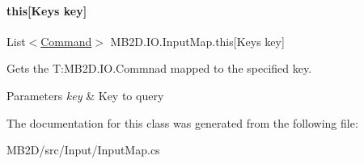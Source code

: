 \paragraph{\texorpdfstring{this[Keys key]}{this[Keys key]}}
{\footnotesize\ttfamily List$<$\hyperlink{class_m_b2_d_1_1_i_o_1_1_command}{Command}$>$ M\+B2\+D.\+I\+O.\+Input\+Map.\+this\mbox{[}Keys key\mbox{]}\hspace{0.3cm}{\ttfamily [get]}}



Gets the T\+:\+M\+B2\+D.\+I\+O.\+Commnad mapped to the specified key. 


\begin{DoxyParams}{Parameters}
{\em key} & Key to query\\
\hline
\end{DoxyParams}


The documentation for this class was generated from the following file\+:\begin{DoxyCompactItemize}
\item 
M\+B2\+D/src/\+Input/Input\+Map.\+cs\end{DoxyCompactItemize}
